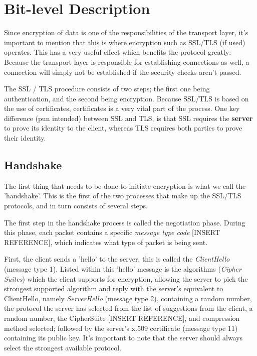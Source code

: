 \section{Bit-level Description} %

Since encryption of data is one of the responsibilities of the transport
layer, it's important to mention that this is where encryption such as SSL/TLS (if used) operates. This has a very useful effect which benefits the protocol greatly: Because the transport layer is responsible for establishing connections as well, a connection will simply not be established if the security checks aren't passed.

The SSL / TLS procedure consists of two steps; the first one being authentication, and the second being encryption. Because SSL/TLS is
based on the use of certificates, certificates is a very vital part of the process. One key difference (pun intended) between SSL and TLS, is that SSL requires the \textbf{server }to prove its identity to the client, whereas TLS requires both parties to prove their identity. 

\subsection[Handshake]{Handshake}
The first thing that needs to be done to initiate encryption is what we
call the 'handshake'. This is the first of the two processes that make up the SSL/TLS protocols, and in turn consists of several steps. 

The first step in the handshake process is called the negotiation phase.
During this phase, each packet contains a specific \textit{message type
code} [INSERT REFERENCE], which indicates what type of packet is being
sent. 

First, the client sends a 'hello' to the server, this is called the \textit{ClientHello} (message type 1).
Listed within this 'hello' message is the algorithms (\textit{Cipher Suites}) which the client supports for encryption, allowing the server to pick the strongest supported algorithm and reply with the server's equivalent to ClientHello, namely \textit{ServerHello }(message type 2), containing a random number, the protocol the server has selected from the list of suggestions from the client, a random number, the CipherSuite [INSERT REFERENCE], and compression method selected; followed by the server's x.509 certificate (message type 11) containing its public key. It's important to note that the server should always select the strongest available protocol.

